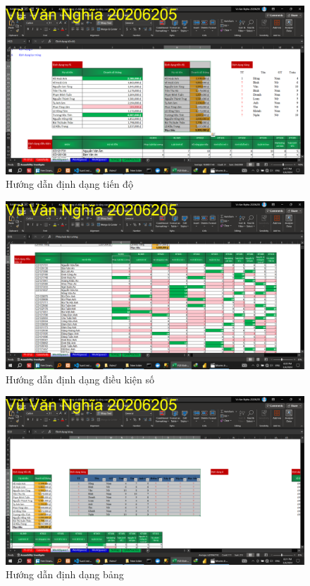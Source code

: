 \documentclass{article}
\begin{document}
\begin{figure}[H]
\centering
\includegraphics[scale = 0.15]{Video7/HuongDan/1.png}
\caption{Hướng dẫn định dạng tiến độ}
\end{figure}

\begin{figure}[H]
\centering
\includegraphics[scale = 0.15]{Video7/HuongDan/2.png}
\caption{Hướng dẫn định dạng điều kiện số}
\end{figure}

\begin{figure}[H]
\centering
\includegraphics[scale = 0.15]{Video7/HuongDan/3.png}
\caption{Hướng dẫn định dạng bảng}
\end{figure}
\end{document}
